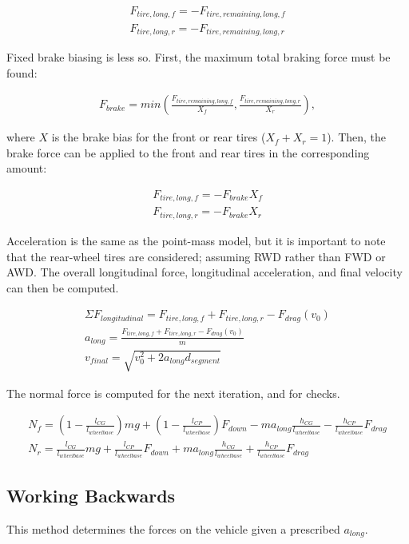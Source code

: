 \documentclass{article}
\begin{document}
\begin{align}
	F_{tire,long,f} = -F_{tire,remaining,long,f} \\
	F_{tire,long,r} = -F_{tire,remaining,long,r}
\end{align}

Fixed brake biasing is less so. First, the maximum total braking force must be found:

\begin{align}
	F_{brake} = min(\frac{F_{tire,remaining,long,f}}{X_{f}}, \frac{F_{tire,remaining,long,r}}{X_{r}}),
\end{align}

where $X$ is the brake bias for the front or rear tires ($X_f + X_r = 1$). Then, the brake force can be applied to the front and rear tires in the corresponding amount:

\begin{align}
	F_{tire,long,f} = - F_{brake} X_{f} \\
	F_{tire,long,r} = - F_{brake} X_{r}
\end{align}

Acceleration is the same as the point-mass model, but it is important to note that the rear-wheel tires are considered; assuming RWD rather than FWD or AWD. The overall longitudinal force, longitudinal acceleration, and final velocity can then be computed.

\begin{align}
	\Sigma F_{longitudinal} = F_{tire,long,f} + F_{tire,long,r} - F_{drag}(v_0) \\
	a_{long} = \frac{ F_{tire,long,f} + F_{tire,long,r} - F_{drag}(v_0)}{m} \\
	v_{final} = \sqrt{v_0^2 + 2 a_{long} d_{segment}}
\end{align}

The normal force is computed for the next iteration, and for checks.

\begin{align}
	N_f = (1 - \frac{l_{CG}}{l_{wheelbase}}) m g 
			+ (1 - \frac{l_{CP}}{l_{wheelbase}}) F_{down}
			- m a_{long} \frac{h_{CG}}{l_{wheelbase}} 
			- \frac{h_{CP}}{l_{wheelbase}} F_{drag} \\
	N_r = \frac{l_{CG}}{l_{wheelbase}} m g 
			+ \frac{l_{CP}}{l_{wheelbase}} F_{down}
			+ m a_{long} \frac{h_{CG}}{l_{wheelbase}} 
			+ \frac{h_{CP}}{l_{wheelbase}} F_{drag}
\end{align}

\subsection{Working Backwards}
This method determines the forces on the vehicle given a prescribed $a_{long}$.
\end{document}
